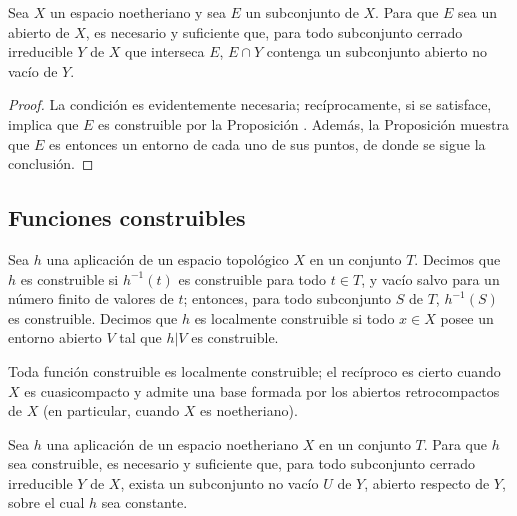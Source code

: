 \documentclass[oneside]{amsart}
\let\EGAOriginalLabel\label
\renewcommand{\label}[1]{\phantomsection\EGAOriginalLabel{#1}}
\begin{document}
\begin{corollary}[9.2.6]
\label{0.9.2.6}
Sea $X$ un espacio noetheriano y sea $E$ un subconjunto de $X$.
Para que $E$ sea un abierto de $X$, es necesario y suficiente que, para todo subconjunto cerrado irreducible $Y$ de $X$ que interseca $E$, $E\cap Y$ contenga un subconjunto abierto no vacío de $Y$.
\end{corollary}

\begin{proof}
La condición es evidentemente necesaria; recíprocamente, si se satisface, implica que $E$ es construible por la Proposición .
Además, la Proposición  muestra que $E$ es entonces un entorno de cada uno de sus puntos, de donde se sigue la conclusión.
\end{proof}

\subsection{Funciones construibles}
\label{subsection:0.9.3}

\begin{definition}[9.3.1]
\label{0.9.3.1}
Sea $h$ una aplicación de un espacio topológico $X$ en un conjunto $T$.
Decimos que $h$ es construible si $h^{-1}(t)$ es construible para todo $t\in T$, y vacío salvo para un número finito de valores de $t$; entonces, para todo subconjunto $S$ de $T$, $h^{-1}(S)$ es construible.
Decimos que $h$ es localmente construible si todo $x\in X$ posee un entorno abierto $V$ tal que $h|V$ es construible.
\end{definition}

Toda función construible es localmente construible; el recíproco es cierto cuando $X$ es cuasicompacto y admite una base formada por los abiertos retrocompactos de $X$ (en particular, cuando $X$ es noetheriano).

\begin{proposition}[9.3.2]
\label{0.9.3.2}
Sea $h$ una aplicación de un espacio noetheriano $X$ en un conjunto $T$.
Para que $h$ sea construible, es necesario y suficiente que, para todo subconjunto cerrado irreducible $Y$ de $X$, exista un subconjunto no vacío $U$ de $Y$, abierto respecto de $Y$, sobre el cual $h$ sea constante.
\end{proposition}
\end{document}
